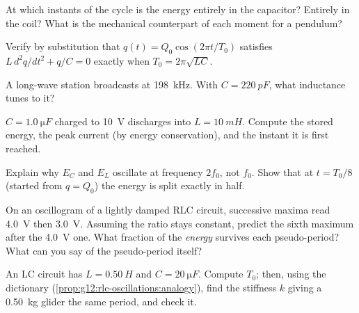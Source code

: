 \begin{exercise}[$\star$]\label{exo:g12:rlc-oscillations:5}
At which instants of the cycle is the energy entirely in the
capacitor? Entirely in the coil? What is the mechanical counterpart of
each moment for a pendulum?
\end{exercise}

\begin{exercise}[$\star\star$]\label{exo:g12:rlc-oscillations:6}
Verify by substitution that $q(t) = Q_0\cos(2\pi t/T_0)$ satisfies
$L\,d^2q/dt^2 + q/C = 0$ exactly when $T_0 = 2\pi\sqrt{LC}$.
\end{exercise}

\begin{exercise}[$\star\star$]\label{exo:g12:rlc-oscillations:7}
A long-wave station broadcasts at \qty{198}{kHz}. With
$C = \qty{220}{pF}$, what inductance tunes to it?
\end{exercise}

\begin{exercise}[$\star\star$]\label{exo:g12:rlc-oscillations:8}
$C = \qty{1.0}{\micro F}$ charged to \qty{10}{V} discharges into
$L = \qty{10}{mH}$. Compute the stored energy, the peak current (by
energy conservation), and the instant it is first reached.
\end{exercise}

\begin{exercise}[$\star\star$]\label{exo:g12:rlc-oscillations:9}
Explain why $E_C$ and $E_L$ oscillate at frequency $2f_0$, not $f_0$.
Show that at $t = T_0/8$ (started from $q = Q_0$) the energy is split
exactly in half.
\end{exercise}

\begin{exercise}[$\star\star$]\label{exo:g12:rlc-oscillations:10}
On an oscillogram of a lightly damped RLC circuit, successive maxima
read \qty{4.0}{V} then \qty{3.0}{V}. Assuming the ratio stays
constant, predict the sixth maximum after the \qty{4.0}{V} one. What
fraction of the \emph{energy} survives each pseudo-period? What can
you say of the pseudo-period itself?
\end{exercise}

\begin{exercise}[$\star\star$]\label{exo:g12:rlc-oscillations:11}
An LC circuit has $L = \qty{0.50}{H}$ and $C = \qty{20}{\micro F}$.
Compute $T_0$; then, using the dictionary
(\cref{prop:g12:rlc-oscillations:analogy}), find the stiffness $k$
giving a \qty{0.50}{kg} glider the same period, and check it.
\end{exercise}

